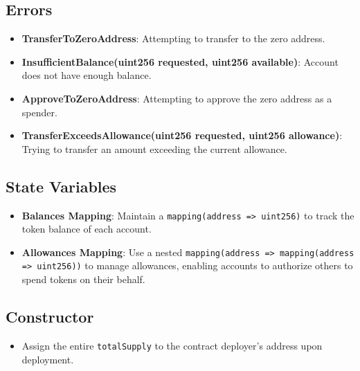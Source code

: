 \documentclass[12pt]{article}
\begin{document}
\subsection*{Errors}
\begin{itemize}
  \item \textbf{TransferToZeroAddress}: Attempting to transfer to the zero address.
  \item \textbf{InsufficientBalance(uint256 requested, uint256 available)}: Account does not have enough balance.
  \item \textbf{ApproveToZeroAddress}: Attempting to approve the zero address as a spender.
  \item \textbf{TransferExceedsAllowance(uint256 requested, uint256 allowance)}: Trying to transfer an amount exceeding the current allowance.
\end{itemize}

\subsection*{State Variables}
\begin{itemize}
  \item \textbf{Balances Mapping}: Maintain a \texttt{mapping(address => uint256)} to track the token balance of each account.
  \item \textbf{Allowances Mapping}: Use a nested \texttt{mapping(address => mapping(address => uint256))} to manage allowances, enabling accounts to authorize others to spend tokens on their behalf.
\end{itemize}

\subsection*{Constructor}
\begin{itemize}
  \item Assign the entire \texttt{totalSupply} to the contract deployer's address upon deployment.
\end{itemize}
\end{document}
